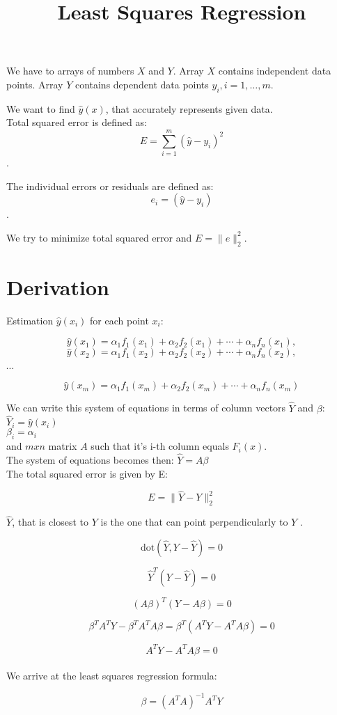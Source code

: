 \documentclass{article}
\title{Least Squares Regression}
\begin{document}
  \maketitle
  \newpage

We have to arrays of numbers $X$ and $Y$. Array $X$ contains independent data points. Array $Y$ contains dependent data points $y_i,i=1,…,m$.

We want to find $\hat{y}(x)$, that accurately represents given data.\\

Total squared error is defined as: 
$$E = \sum_{i=1}^m (\hat{y} - y_i)^2$$. 

The individual errors or residuals are defined as: 
$$e_i = (\hat{y} - y_i)$$.

We try to minimize total squared error and $E = \|{e}\|_{2}^{2}$.

\section*{Derivation}

Estimation $\hat{y}(x_i)$ for each point $x_i$:

$$\hat{y}(x_1) = {\alpha}_1 f_1(x_1) + {\alpha}_2 f_2(x_1) + \cdots + {\alpha}_n f_n(x_1),$$
$$\hat{y}(x_2) = {\alpha}_1 f_1(x_2) + {\alpha}_2 f_2(x_2) + \cdots + {\alpha}_n f_n(x_2),$$
\begin{center}$ \cdots $ \end{center}
$$\hat{y}(x_m) = {\alpha}_1 f_1(x_m) + {\alpha}_2 f_2(x_m) + \cdots + {\alpha}_n f_n(x_m)$$

We can write this system of equations in terms of column vectors $\hat{Y}$ and $\beta$:\\

$\hat{Y}_i = \hat{y}(x_i)$\\
$\beta_i = {\alpha}_i$\\

and $m x n$ matrix $A$ such that it's i-th column equals $F_i(x)$.\\

The system of equations becomes then: $\hat{Y} = A{\beta}$\\

The total squared error is given by E:

$$E = \|{\hat{Y} - Y}\|_{2}^2$$

$\hat{Y}$, that is closest to $Y$ is the one that can point perpendicularly to $Y$ .

$${\text{dot}}(\hat{Y}, Y - \hat{Y}) = 0$$

$$\hat{Y}^T (Y - \hat{Y}) = 0$$

$$(A{\beta})^T(Y - A{\beta}) = 0$$

$${\beta}^T A^T Y - {\beta}^T A^T A {\beta} = {\beta}^T(A^T Y - A^T A {\beta}) = 0$$

$$A^T Y - A^T A {\beta} = 0$$\\

We arrive at the least squares regression formula:

$${\beta} = (A^T A)^{-1} A^T Y$$
\end{document}
